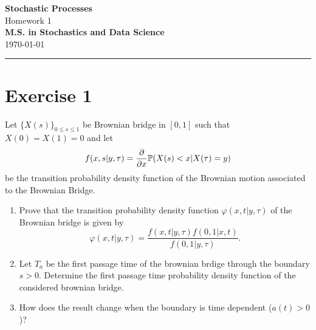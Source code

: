 \documentclass[12pt]{article}
\begin{document}
	\textcolor{UM_Brown}{
		\begin{center}
			\textbf{\Large Stochastic Processes}\\
			\vspace{5pt}
			Homework 1 \\
			\vspace{5pt}
			\textbf{M.S. in Stochastics and Data Science}\\
			\vspace{20pt}
			\vspace{5pt}
			\today
		\end{center}
		\vspace{10pt}
		\hrule
	}
	
	
	
	
	\section*{Exercise 1}
	Let ${\{X(s)\}}_{0\leq s\leq 1}$ be Brownian bridge in $[0,1]$ such that $X(0)=X(1)=0$ and let 
	\begin{equation*}
		f(x,s|y,\tau)=\frac{\partial}{\partial x}\mathbb{P}(X(s)<x|X(\tau)=y)
	\end{equation*}
	be the transition probability density function of the Brownian motion associated to the Brownian Bridge.
	\begin{enumerate}
		\item Prove that the transition probability density function $\varphi(x,t|y,\tau)$ of the Brownian bridge is given by 
		\begin{equation*}
			\varphi(x,t|y,\tau)=\frac{f(x,t|y,\tau)f(0,1|x,t)}{f(0,1|y,\tau)}.
		\end{equation*}
		\item Let $T_a$ be the first passage time of the brownian brdige through the boundary $s>0$. Determine the first passage time probability density function of the considered brownian bridge.
		\item How does the result change when the boundary is time dependent ($a(t)>0$)?
	\end{enumerate}
\end{document}
